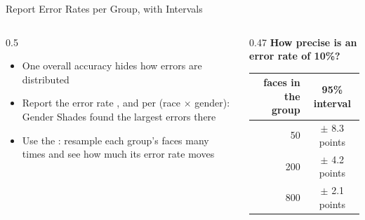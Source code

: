 \begin{frame}{Report Error Rates per Group, with Intervals}
\begin{columns}[T]
\begin{column}{0.5\textwidth}
\begin{itemize}
\item One overall accuracy hides how errors are distributed
\item Report the error rate , and per  (race $\times$
      gender): Gender Shades found the largest errors there
\item Use the : resample each group's faces many times and see how much its
      error rate moves
\end{itemize}
\end{column}
\begin{column}{0.47\textwidth}
\textbf{How precise is an error rate of 10\%?}

\vspace{0.1cm}
{\footnotesize
\begin{tabular}{@{}rc@{}}
\toprule
faces in the group & 95\% interval \\
\midrule
50 & $\pm$ 8.3 points \\
200 & $\pm$ 4.2 points \\
800 & $\pm$ 2.1 points \\
\bottomrule
\end{tabular}}

\vspace{0.15cm}
\end{column}
\end{columns}
\end{frame}

